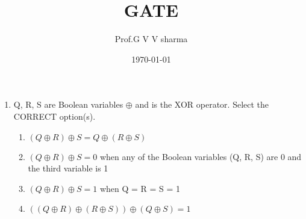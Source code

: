 \documentclass{article}
\title{GATE}
\author{Prof.G V V sharma}
\date{\today}
\begin{document}

\begin{enumerate}

\item Q, R, S are Boolean variables  $ \oplus$ and is the XOR operator. Select the CORRECT option(s).


\begin{enumerate}
\item $(Q  \oplus  R)  \oplus  S = Q  \oplus  (R  \oplus  S) $
\item $(Q  \oplus  R)  \oplus  S = 0$ when any of the Boolean variables (Q, R, S) are 0 and the third variable is 1
\item $(Q  \oplus  R)  \oplus  S = 1$ when Q = R = S = 1
\item $((Q  \oplus  R)  \oplus  (R  \oplus  S))  \oplus  (Q  \oplus  S) = 1$
\end{enumerate}


\end{enumerate}
\end{document}
